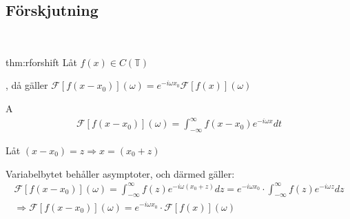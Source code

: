 \subsection{Förskjutning}\hfill\\\par
\begin{theo}[Förskjutning]{thm:rforshift}
  Låt $f(x)\in C(\mathbb{T})$\par, då gäller $\mathcal{F}\left[f(x-x_0)\right](\omega) = e^{-i\omega x_0}\mathcal{F}\left[f(x)\right](\omega)$
\end{theo}
\par\bigskip
\begin{prf}
  A
  \begin{equation*}
    \begin{gathered}
      \mathcal{F}\left[f(x-x_0)\right](\omega)=\int_{-\infty}^{\infty}f(x-x_0)e^{-i\omega x}dt
    \end{gathered}
  \end{equation*}
  \par\bigskip
  \noindent Låt $(x-x_0) = z\Rightarrow x = (x_0+z)$
  \par\bigskip
  \noindent Variabelbytet behåller asymptoter, och därmed gäller:
  \begin{equation*}
    \begin{gathered}
      \mathcal{F}\left[f(x-x_0)\right](\omega)=\int_{-\infty}^{\infty}f(z)e^{-i\omega(x_0+z)}dz = e^{-i\omega x_0}\cdot\int_{-\infty}^{\infty}f(z)e^{-i\omega z}dz\\
      \Rightarrow \mathcal{F}\left[f(x-x_0)\right](\omega) = e^{-i\omega x_0}\cdot\mathcal{F}\left[f(x)\right](\omega)
    \end{gathered}
  \end{equation*}
\end{prf}
\newpage
